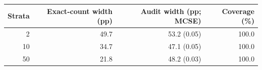 \begin{tabular}{rrrr}
\toprule
Strata & Exact-count width (pp) & Audit width (pp; MCSE) & Coverage (\%) \\
\midrule
2 & 49.7 & 53.2 (0.05) & 100.0 \\
10 & 34.7 & 47.1 (0.05) & 100.0 \\
50 & 21.8 & 48.2 (0.03) & 100.0 \\
\bottomrule
\end{tabular}

